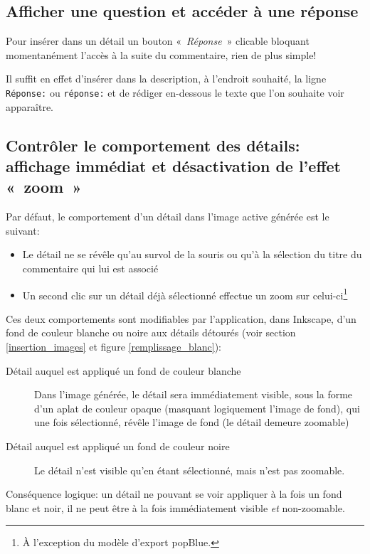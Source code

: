 {\subsection{Afficher une question et accéder à une réponse}

Pour insérer dans un détail un bouton «~\textit{Réponse}~» clicable bloquant momentanément l'accès à la suite du commentaire,
rien de plus simple!

Il suffit en effet d'insérer dans la description, à l'endroit souhaité, la ligne\\
\verb|Réponse:| ou \verb|réponse:| et de rédiger en-dessous le texte que l'on souhaite voir apparaître.

\subsection{Contrôler le comportement des détails: affichage immédiat et désactivation
de l'effet «~zoom~»}\label{couche_XML}

Par défaut, le comportement d'un détail dans l'image active générée est le suivant:
\begin{itemize}
 \item Le détail ne se révêle qu'au survol de la souris ou qu'à la sélection du titre du commentaire
 qui lui est associé
 \item Un second clic sur un détail déjà sélectionné effectue un zoom sur celui-ci\footnote{À l'exception
 du modèle d'export popBlue.	}
\end{itemize}

Ces deux comportements sont modifiables par l'application, dans Inkscape, d'un fond de couleur blanche ou noire
aux détails détourés (voir section \ref{insertion_images} et figure \ref{remplissage_blanc}):
\begin{description}
 \item [Détail auquel est appliqué un fond de couleur blanche] Dans l'image générée, 
 le détail sera immédiatement visible, sous la forme d'un aplat de couleur opaque (masquant
 logiquement l'image de fond), qui une fois sélectionné, révêle l'image de fond (le détail demeure zoomable)
 \item [Détail auquel est appliqué un fond de couleur noire] Le détail n'est visible qu'en étant sélectionné, mais
 n'est pas zoomable.
\end{description}

Conséquence logique: un détail ne pouvant se voir appliquer à la fois un fond blanc et noir, il ne peut être à la
fois immédiatement visible \textit{et} non-zoomable.

}
